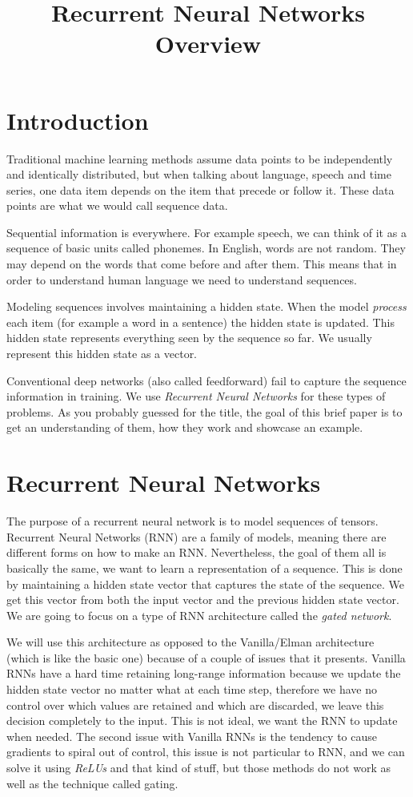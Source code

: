 \documentclass[12pt]{IEEEtran}
\title{Recurrent Neural Networks Overview}
\author{
  \IEEEauthorblockN{Benjamin Santana}
  \IEEEauthorblockA{\\
    Universidad Panamericana\\
    Email: 0211518@up.edu.mx}
}
\begin{document}
\maketitle


\section{Introduction}
Traditional machine learning methods assume data points to be independently and
identically distributed, but when talking about language, speech and time
series, one data item depends on the item that precede or follow it. These
data points are what we would call sequence data.

Sequential information is everywhere. For example speech, we can think of it
as a sequence of basic units called phonemes. In English, words are not random.
They may depend on the words that come before and after them. This means that
in order to understand human language we need to understand sequences.

Modeling sequences involves maintaining a hidden state. When the model
\emph{process} each item (for example a word in a sentence) the hidden state is
updated. This hidden state represents everything seen by the sequence so far.
We usually represent this hidden state as a vector.

Conventional deep networks (also called feedforward) fail to capture the
sequence information in training. We use \emph{Recurrent Neural Networks} for
these types of problems. As you probably guessed for the title, the goal of
this brief paper is to get an understanding of them, how they work and
showcase an example.

\section{Recurrent Neural Networks}
The purpose of a recurrent neural network is to model sequences of tensors.
Recurrent Neural Networks (RNN) are a family of models, meaning there are
different forms on how to make an RNN. Nevertheless, the goal of them all is
basically the same, we want to learn a representation of a sequence. This is
done by maintaining a hidden state vector that captures the state of the
sequence. We get this vector from both the input vector and the previous
hidden state vector. We are going to focus on a type of RNN architecture
called the \emph{gated network}.

We will use this architecture as opposed to the Vanilla/Elman
architecture (which is like the basic one) because of a couple of issues that it
presents. Vanilla RNNs have a hard time retaining long-range information
because we update the hidden state vector no matter what at each time step,
therefore we have no control over which values are retained and which are
discarded, we leave this decision completely to the input. This is not ideal,
we want the RNN to update when needed. The second issue with Vanilla RNNs is
the tendency to cause gradients to spiral out of control, this issue is not
particular to RNN, and we can solve it using \emph{ReLUs} and that kind of
stuff, but those methods do not work as well as the technique called gating.
\end{document}
